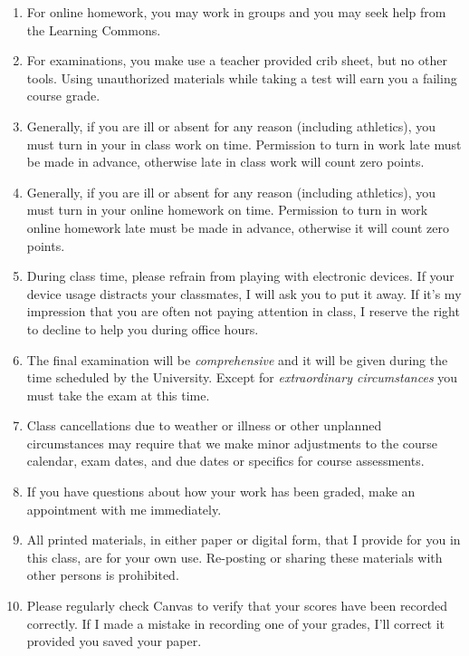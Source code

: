 \documentclass[12pt]{article}
\newcounter{ex}\setcounter{ex}{0}
\begin{document}
\begin{enumerate}

    \item For online homework, you may work in groups and you may 
    seek help from the Learning Commons. 

\item For examinations, you make use a teacher provided crib sheet, but no other 
tools. Using unauthorized materials while taking a test will earn you a failing 
course grade. 

    \item Generally, if you are ill or absent for any reason (including 
    athletics), you must turn in your in class work on time. Permission to
    turn in work late must be made in advance, otherwise late in class work 
    will count zero points.

    \item Generally,  if you are ill or absent for any reason (including 
    athletics), you must turn in your online homework on time. Permission to
    turn in work online homework late must be made in advance, otherwise it will
    count zero points.
 

\item During class time, please refrain from playing with electronic devices. If your 
device usage distracts your classmates, I will ask you to put it away. If it's my 
impression that you are often not paying attention in class, I reserve the right to 
decline to help you during office hours.

\item The final examination will be \emph{comprehensive} and it will be given during the time scheduled by the University. Except for \emph{extraordinary circumstances}
you must take the exam at this time.

\item Class cancellations due to weather or illness or other 
unplanned circumstances may require that we make minor adjustments
to the course calendar, exam dates, and due dates or specifics for 
course assessments.

 
\item If you have questions about how your work has been graded, make an appointment with me immediately.

\item All printed materials, in either paper or digital form, that I provide for you in this class, are for your own use. Re-posting or sharing these 
materials with other persons is prohibited. 

\item Please regularly check Canvas  to verify that your scores have been recorded correctly.  If I made a mistake in recording one of
your grades, I'll correct it provided you saved your paper.

\end{enumerate}
\end{document}
